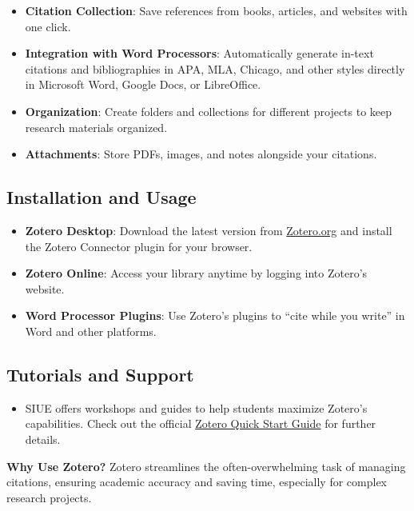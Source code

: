 \documentclass[
]{book}
\providecommand{\tightlist}{%
  \setlength{\itemsep}{0pt}\setlength{\parskip}{0pt}}
\begin{document}
\begin{itemize}
\tightlist
\item
  \textbf{Citation Collection}: Save references from books, articles, and websites with one click.
\item
  \textbf{Integration with Word Processors}: Automatically generate in-text citations and bibliographies in APA, MLA, Chicago, and other styles directly in Microsoft Word, Google Docs, or LibreOffice.
\item
  \textbf{Organization}: Create folders and collections for different projects to keep research materials organized.
\item
  \textbf{Attachments}: Store PDFs, images, and notes alongside your citations.
\end{itemize}

\subsection*{Installation and Usage}\label{installation-and-usage}

\begin{itemize}
\tightlist
\item
  \textbf{Zotero Desktop}: Download the latest version from \href{https://www.zotero.org/}{Zotero.org} and install the Zotero Connector plugin for your browser.
\item
  \textbf{Zotero Online}: Access your library anytime by logging into Zotero's website.
\item
  \textbf{Word Processor Plugins}: Use Zotero's plugins to ``cite while you write'' in Word and other platforms.
\end{itemize}

\subsection*{Tutorials and Support}\label{tutorials-and-support}

\begin{itemize}
\tightlist
\item
  SIUE offers workshops and guides to help students maximize Zotero's capabilities. Check out the official \href{https://www.zotero.org/support/quick_start_guide}{Zotero Quick Start Guide} for further details.
\end{itemize}

\textbf{Why Use Zotero?} Zotero streamlines the often-overwhelming task of managing citations, ensuring academic accuracy and saving time, especially for complex research projects.
\end{document}
